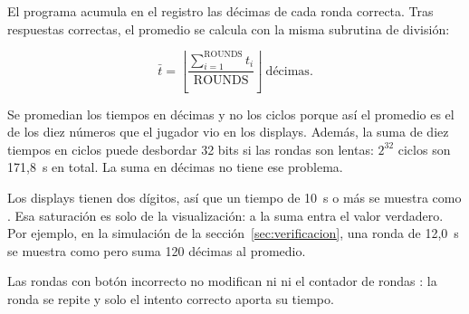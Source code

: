 El programa acumula en el registro  las décimas de cada ronda correcta. Tras
 respuestas correctas, el promedio se calcula con la misma subrutina de
división:

\[
  \bar{t} = \left\lfloor \frac{\sum_{i=1}^{\text{ROUNDS}} t_i}{\text{ROUNDS}} \right\rfloor~\text{décimas}.
\]

Se promedian los tiempos en décimas y no los ciclos porque así el promedio es el de los
diez números que el jugador vio en los displays. Además, la suma de diez tiempos en
ciclos puede desbordar 32 bits si las rondas son lentas: $2^{32}$ ciclos son 171,8~s en
total. La suma en décimas no tiene ese problema.

Los displays tienen dos dígitos, así que un tiempo de 10~s o más se muestra como
. Esa saturación es solo de la visualización: a la suma entra el valor
verdadero. Por ejemplo, en la simulación de la sección~\ref{sec:verificacion}, una
ronda de 12,0~s se muestra como  pero suma 120 décimas al promedio.

Las rondas con botón incorrecto no modifican ni  ni el contador de rondas
: la ronda se repite y solo el intento correcto aporta su tiempo.
